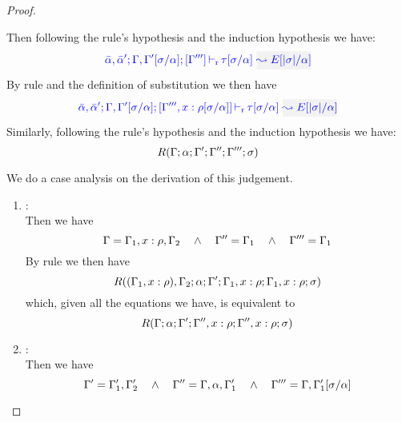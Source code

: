 \begin{proof}
\begin{description}
Then following the rule's hypothesis and the induction hypothesis we have:
\begin{equation*}
  \dlres{\bar{\alpha},\bar{\alpha}'}{\tenv,\tenv'[\suty/\alpha]}{\tenv'''}{\type[\suty/\alpha]}{E[|\suty|/\alpha]}
\end{equation*}
  By rule  and the definition of substitution we then have
\begin{equation*}
  \dlres{\bar{\alpha},\bar{\alpha}'}{\tenv,\tenv'[\suty/\alpha]}{\tenv''',\relation{x}{\rulet[\suty/\alpha]}}{\type[\suty/\alpha]}{E[|\suty|/\alpha]}
\end{equation*}
  Similarly, following the rule's hypothesis and the induction hypothesis we have:
\begin{equation*}
  R(\Gamma;\alpha;\Gamma';\Gamma'';\Gamma''';\sigma)
\end{equation*}

  We do a case analysis on the derivation of this judgement.
  \begin{enumerate}
  \item {}: \\ Then we have
\begin{equation*}
  \Gamma = \Gamma_1,x:\rho,\Gamma_2  \quad\wedge\quad \Gamma'' = \Gamma_1 \quad\wedge\quad \Gamma''' = \Gamma_1
\end{equation*}
       By rule  we then have
\begin{equation*}
R((\Gamma_1,x:\rho),\Gamma_2;\alpha;\Gamma';\Gamma_1,x:\rho;\Gamma_1,x:\rho;\sigma)
\end{equation*}
        which, given all the equations we have, is equivalent to
\begin{equation*}
R(\Gamma;\alpha;\Gamma';\Gamma'',x:\rho;\Gamma'',x:\rho;\sigma)
\end{equation*}

  \item {}: \\
   Then we have
\begin{equation*}
  \Gamma' = \Gamma_1',\Gamma_2' \quad\wedge\quad \Gamma'' = \Gamma,\alpha,\Gamma_1' \quad\wedge\quad
      \Gamma''' = \Gamma,\Gamma_1'[\sigma/\alpha]
\end{equation*}


\end{enumerate}
\end{description}
\end{proof}
